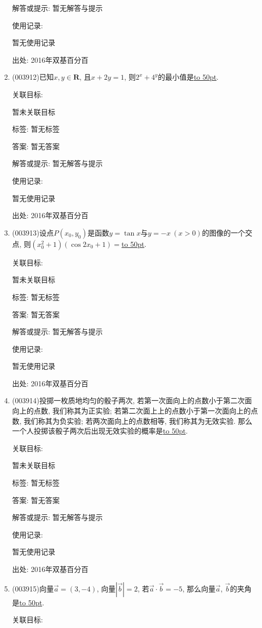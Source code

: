 \documentclass[10pt,a4paper]{article}
\newcommand{\blank}[1]{\underline{\hbox to #1pt{}}}
\begin{document}
\begin{enumerate}[1.]
解答或提示: 暂无解答与提示

使用记录:

暂无使用记录


出处: 2016年双基百分百
\item { (003912)}已知$x,y\in \mathbf{R}$, 且$x+2y=1$, 则$2^x+4^y$的最小值是\blank{50}.


关联目标:

暂未关联目标



标签: 暂无标签

答案: 暂无答案

解答或提示: 暂无解答与提示

使用记录:

暂无使用记录


出处: 2016年双基百分百
\item { (003913)}设点$P(x_0,y_0)$是函数$y=\tan x$与$y=-x \ (x>0)$的图像的一个交点, 则$(x_0^2+1)(\cos 2x_0+1)=$\blank{50}.


关联目标:

暂未关联目标



标签: 暂无标签

答案: 暂无答案

解答或提示: 暂无解答与提示

使用记录:

暂无使用记录


出处: 2016年双基百分百
\item { (003914)}投掷一枚质地均匀的骰子两次, 若第一次面向上的点数小于第二次面向上的点数, 我们称其为正实验; 若第二次面上上的点数小于第一次面向上的点数, 我们称其为负实验; 若两次面向上的点数相等, 我们称其为无效实验. 那么一个人投掷该骰子两次后出现无效实验的概率是\blank{50}.


关联目标:

暂未关联目标



标签: 暂无标签

答案: 暂无答案

解答或提示: 暂无解答与提示

使用记录:

暂无使用记录


出处: 2016年双基百分百
\item { (003915)}向量$\overrightarrow{a}=(3,-4)$, 向量$\left|\overrightarrow b\right|=2$, 若$\overrightarrow a\cdot \overrightarrow b=-5$, 那么向量$\overrightarrow a$, $\overrightarrow b$的夹角是\blank{50}.


关联目标:


\end{enumerate}
\end{document}

